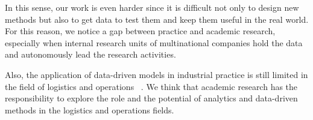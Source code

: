 In this sense, our work is even harder since it is difficult not only to design new methods but also to get data to test them and keep them useful in the real world. For this reason, we notice a gap between practice and academic research, especially when internal research units of multinational companies hold the data and autonomously lead the research activities.\par

Also, the application of data-driven models in industrial practice is still limited in the field of logistics and operations ~\cite{Garver2019}. We think that academic research has the responsibility to explore the role and the potential of analytics and data-driven methods in the logistics and operations fields.\par



